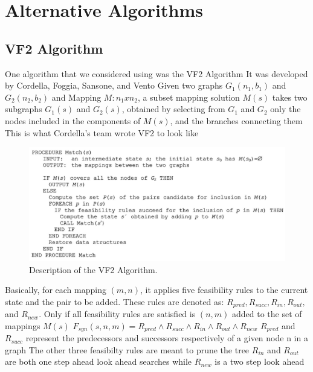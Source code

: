 \documentclass{article}
\begin{document}
\section{Alternative Algorithms}

  \subsection{VF2 Algorithm}

  One algorithm that we considered using was the VF2 Algorithm
  It was developed by Cordella, Foggia, Sansone, and Vento
  Given two graphs $G_1(n_1,b_1)$ and $G_2(n_2,b_2)$ and Mapping $M : n_1 x n_2$, a subset mapping solution $M(s)$ takes two subgraphs $G_1(s)$ and $G_2(s)$, obtained by selecting from $G_1$ and $G_2$
  only the nodes included in the components of $M(s)$, and the branches connecting them
  This is what Cordella's team wrote VF2 to look like

  \begin{figure}[H]
    \centering
    \includegraphics[scale=0.7]{images/vf2_rules.png}
    \caption{Description of the VF2 Algorithm.}
    \label{fig:vf2algo}
  \end{figure}

  Basically, for each mapping $(m,n)$, it applies five feasibility rules to the current state and the pair to be added. These rules are denoted as: $R_{pred}, R_{succ}, R_{in}, R_{out},$ and $R_{new}$. Only if all feasibility rules are satisfied is $(n,m)$ added to the set of mappings $M(s)$
  $F_{syn}(s,n,m) = R_{pred} \land R_{succ} \land R_{in} \land R_{out} \land R_{new}$
  $R_{pred}$ and $R_{succ}$ represent the predecessors and successors respectively of a given node n in a graph
  The other three feasibilty rules are meant to prune the tree
  $R_{in}$ and $R_{out}$ are both one step ahead look ahead searches while $R_{new}$ is a two step look ahead
\end{document}
